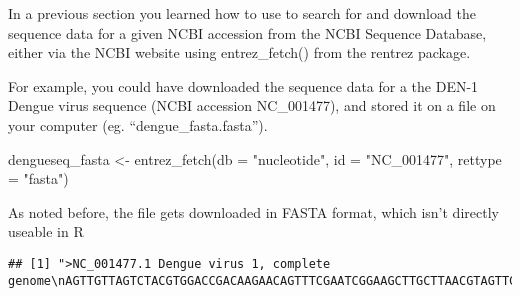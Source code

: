 \documentclass[
]{book}
\newenvironment{Shaded}{\begin{snugshade}}{\end{snugshade}}
\newcommand{\AttributeTok}[1]{\textcolor[rgb]{0.77,0.63,0.00}{#1}}
\newcommand{\FunctionTok}[1]{\textcolor[rgb]{0.00,0.00,0.00}{#1}}
\newcommand{\NormalTok}[1]{#1}
\newcommand{\OtherTok}[1]{\textcolor[rgb]{0.56,0.35,0.01}{#1}}
\newcommand{\StringTok}[1]{\textcolor[rgb]{0.31,0.60,0.02}{#1}}
\begin{document}
In a previous section you learned how to use to search for and download the sequence data for a given NCBI accession from the NCBI Sequence Database, either via the NCBI website using entrez\_fetch() from the rentrez package.

For example, you could have downloaded the sequence data for a the DEN-1 Dengue virus sequence (NCBI accession NC\_001477), and stored it on a file on your computer (eg. ``dengue\_fasta.fasta'').

\begin{Shaded}
\begin{Highlighting}[]
\NormalTok{dengueseq\_fasta }\OtherTok{\textless{}{-}} \FunctionTok{entrez\_fetch}\NormalTok{(}\AttributeTok{db =} \StringTok{"nucleotide"}\NormalTok{, }
                          \AttributeTok{id =} \StringTok{"NC\_001477"}\NormalTok{, }
                          \AttributeTok{rettype =} \StringTok{"fasta"}\NormalTok{)}
\end{Highlighting}
\end{Shaded}

As noted before, the file gets downloaded in FASTA format, which isn't directly useable in R

\begin{verbatim}
## [1] ">NC_001477.1 Dengue virus 1, complete genome\nAGTTGTTAGTCTACGTGGACCGACAAGAACAGTTTCGAATCGGAAGCTTGCTTAACGTAGTTCTAACAGT\nTTTTTATTAGAGAGCAGATCTCTGATGAACAACCAACGGAAAAAGACGGGTCGACCGTCTTTCAATATGC\nTGAAACGCGCGAGAAACCGCGTGTCAACTGTTTCACAGTTGGCGAAGAGATTCTCAAAAGGAT"
\end{verbatim}
\end{document}
